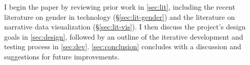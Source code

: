 I begin the paper by reviewing prior work in \autoref{sec:lit}, including the recent literature on gender in technology (\S\ref{sec:lit-gender}) and the literature on narrative data visualization (\S\ref{sec:lit-vis}). I then discuss the project's design goals in \autoref{sec:design}, followed by an outline of the iterative development and testing process in \autoref{sec:dev}. \autoref{sec:conclusion} concludes with a discussion and suggestions for future improvements.
